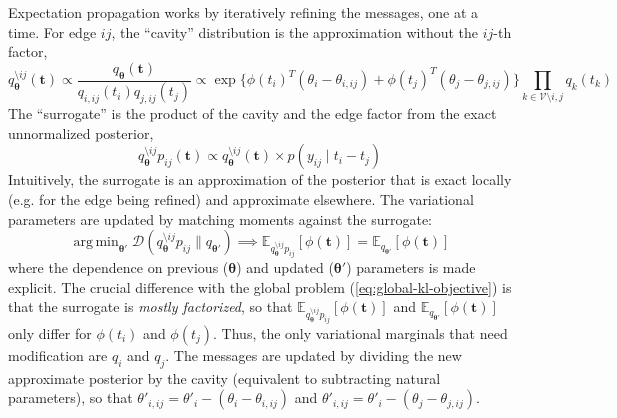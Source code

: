 \documentclass{article}
\DeclareMathOperator*{\argmin}{arg\,min}
\begin{document}
Expectation propagation works by iteratively refining the messages, one at a time. For edge $ij$, the ``cavity'' distribution is the approximation without the $ij$-th factor,
\[
q^{\setminus ij}_{\bm \theta}(\bm t) \propto \frac{q_{\bm \theta}(\bm t)}{q_{i,ij}(t_i) q_{j,ij}(t_j)} \propto \exp\{ \phi(t_i)^T (\theta_i - \theta_{i,ij}) + \phi(t_j)^T (\theta_j - \theta_{j,ij})\} \prod_{k \in \mathcal{V} \setminus i,j} q_k(t_k)
\]
The ``surrogate'' is the product of the cavity and the edge factor from the exact unnormalized posterior,
\[
q^{\setminus ij}_{\bm \theta} p_{ij} (\bm t) \propto q^{\setminus ij}_{\bm \theta}(\bm t) \times p(y_{ij} \mid t_i - t_j)
\]
Intuitively, the surrogate is an approximation of the posterior that is exact locally (e.g. for the edge being refined) and approximate elsewhere. The variational parameters are updated by matching moments against the surrogate:
\[
\argmin_{\bm \theta'} \mathcal{D}( q^{\setminus ij}_{\bm \theta} p_{ij} \| q_{\bm \theta'} ) \implies \mathbb{E}_{q^{\setminus ij}_{\bm \theta} p_{ij}}[\phi(\bm t)] = \mathbb{E}_{q_{\bm \theta'}}[\phi(\bm t)]
\]
where the dependence on previous ($\bm \theta$) and updated ($\bm \theta'$) parameters is made explicit. The crucial difference with the global problem (\ref{eq:global-kl-objective}) is that the surrogate is \emph{mostly factorized}, so that $\mathbb{E}_{q^{\setminus ij}_{\bm \theta} p_{ij}}[\phi(\bm t)]$ and $\mathbb{E}_{q_{\bm \theta'}}[\phi(\bm t)]$ only differ for $\phi(t_i)$ and $\phi(t_j)$. Thus, the only variational marginals that need modification are $q_{i}$ and $q_{j}$. The messages are updated by dividing the new approximate posterior by the cavity (equivalent to subtracting natural parameters), so that $\theta'_{i,ij} = \theta'_i - (\theta_i - \theta_{i,ij})$ and $\theta'_{i,ij} = \theta'_i - (\theta_j - \theta_{j,ij})$. 
\end{document}
